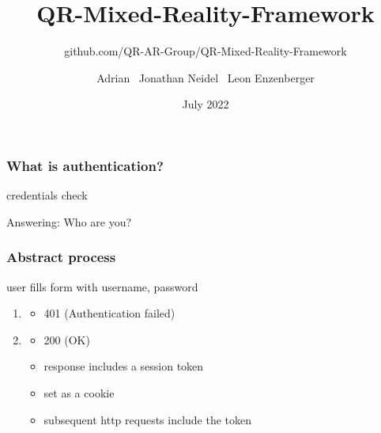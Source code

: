 \documentclass{beamer}
\title{QR-Mixed-Reality-Framework}
\subtitle{github.com/QR-AR-Group/QR-Mixed-Reality-Framework}
\author{
  Adrian \
  Jonathan Neidel \
  Leon Enzenberger
}
\date{July 2022}
\institute{HTW Berlin, Angewandte Informatik, AR Applications and Theoretical Foundations}
\begin{document}
\frame{\titlepage}

\begin{frame}
  \frametitle{What is authentication?}

  credentials check

  \bigskip

  Answering: Who are you?
\end{frame}

\begin{frame}
  \frametitle{Abstract process}

  user fills form with username, password
  \begin{enumerate}
    \item \begin{itemize}
      \item 401 (Authentication failed)
    \end{itemize}
    \item \begin{itemize}
      \item 200 (OK)
      \item response includes a session token
      \item set as a cookie
      \item subsequent http requests include the token
    \end{itemize}
  \end{enumerate}
\end{frame}

\end{document}
